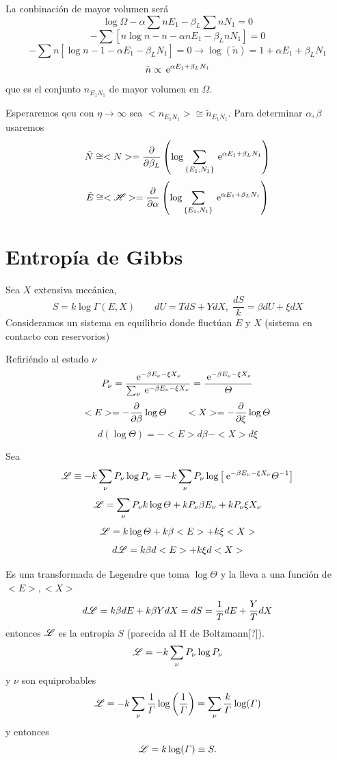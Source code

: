 \documentclass[10pt,oneside]{CBFT_book}
\begin{document}
La conbinación de mayor volumen será 
\[
	\log \Omega - \alpha \sum n E_1 - \beta_L \sum n N_1 = 0
\]
\[
	-\sum \left[ n\log n - n - \alpha n E_1 - \beta_L n N_1 \right] = 0
\]
\[
	-\sum n \left[ \log n - 1 - \alpha E_1 - \beta_L N_1 \right] = 0 
	\rightarrow \log(\tilde{n}) = 1 + \alpha E_1 + \beta_L N_1
\]
\[
	\tilde{n} \propto \:\mathrm{e}^{\alpha E_1 + \beta_L N_1}
\]
que es el conjunto $n_{E_1N_1}$ de mayor volumen en $ \Omega $.

Esperaremos qeu con $ \eta\to\infty $ sea $<n_{E_1N_1}> \cong \tilde{n}_{E_1N_1} $.
Para determinar $\alpha, \beta$ usaremos 
\[
	\tilde{N} \cong <N> = \frac{\partial^{\hspace{-0.05em}} {}}{\partial {\beta_L}^{\hspace{-0.05em}}}\left( \log \sum_{\{ E_1, N_1 \}} 
	\:\mathrm{e}^{\alpha E_1 + \beta_L N_1} \right)
\]
\[
	\tilde{E} \cong <\mathscr{H}> =  \frac{\partial^{\hspace{-0.05em}} {}}{\partial {\alpha}^{\hspace{-0.05em}}}\left( \log \sum_{\{ E_1, N_1 \}}
	\:\mathrm{e}^{\alpha E_1 + \beta_L N_1} \right)
\]

\section{Entropía de Gibbs}

Sea $X$ extensiva mecánica,
\[
	S = k \log \Gamma (E,X) \qquad dU = TdS + Y dX, \; \frac{dS}{k} = \beta dU + \xi dX
\]
Consideramos un sistema en equilibrio donde fluctúan $E$ y $X$ (sistema en contacto con reservorios)

Refiriéndo al estado $ \nu $
\[
	P_\nu = \frac{ \:\mathrm{e}^{-\beta E_\nu - \xi X_\nu } }{ \sum_\nu \:\mathrm{e}^{-\beta E_\nu - \xi X_\nu } } =
	\frac{ \:\mathrm{e}^{-\beta E_\nu - \xi X_\nu }}{\Theta}
\]
\[
	<E> = -\frac{\partial^{\hspace{-0.05em}} {}}{\partial {\beta}^{\hspace{-0.05em}}} \log \Theta  \qquad <X> = -\frac{\partial^{\hspace{-0.05em}} {}}{\partial {\xi}^{\hspace{-0.05em}}} \log \Theta 
\]
\[
	d( \log \Theta ) = -<E> d\beta - <X> d\xi 
\]

Sea 
\[
	\mathscr{L} \equiv -k \sum_\nu P_\nu \log P_\nu =
	-k \sum_\nu P_\nu \log \left[ \:\mathrm{e}^{-\beta E_\nu - \xi X_\nu } \Theta^{-1} \right]
\]
\[
	\mathscr{L} = \sum_\nu P_\nu k \log \Theta + k P_\nu \beta E_\nu + k P_\nu \xi X_\nu
\]
\[
	\mathscr{L} = k\log \Theta + k\beta <E> + k\xi <X>
\]
\[
	d\mathscr{L} = k\beta d<E> + k\xi d<X>
\]

Es una transformada de Legendre que toma $\log \Theta$ y la lleva a una función de $ <E>, <X> $
\[
	d\mathscr{L} = k \beta dE + k \beta Y dX = dS = \frac{1}{T}dE + \frac{Y}{T} dX 
\]
entonces $\mathscr{L}$ es la entropía $S$ (parecida al H de Boltzmann[?]).
\[
	\mathscr{L} = -k \sum_\nu P_\nu \log P_\nu 
\]
y $\nu$ son equiprobables
\[
	\mathscr{L} = -k \sum_\nu \frac{1}{\Gamma} \log \left( \frac{1}{\Gamma} \right) = 
	\sum_\nu \frac{k}{\Gamma} \log(\Gamma)
\]
y entonces
\[
	\mathscr{L} = k \log( \Gamma ) \equiv S.
\]
\end{document}
